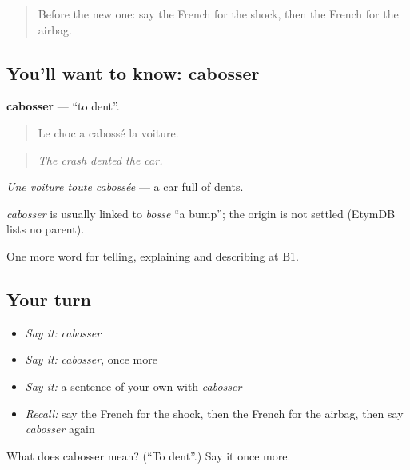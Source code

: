 \label{lesson:FR-C298-cabosser}



\begin{quote}
Before the new one: say the French for the shock, then the French for the airbag.
\end{quote}

\subsection*{You'll want to know: cabosser}
\textbf{cabosser} — \textquotedblleft{}to dent\textquotedblright{}.

\begin{quote}
Le choc a cabossé la voiture.
\end{quote}

\begin{quote}
\emph{The crash dented the car.}
\end{quote}

\emph{Une voiture toute cabossée} — a car full of dents.

\begin{cousinweb}
\emph{cabosser} is usually linked to \emph{bosse} \textquotedblleft{}a bump\textquotedblright{}; the origin is not settled (EtymDB lists no parent).
\end{cousinweb}

\begin{grammarlens}[title={What you've built}]
One more word for telling, explaining and describing at B1.
\end{grammarlens}

\subsection*{Your turn}
\begin{itemize}
\raggedright
  \item \emph{Say it:} \emph{cabosser}
  \item \emph{Say it:} \emph{cabosser}, once more
  \item \emph{Say it:} a sentence of your own with \emph{cabosser}
  \item \emph{Recall:} say the French for the shock, then the French for the airbag, then say \emph{cabosser} again
\end{itemize}

\begin{tcolorbox}[breakable,colback=teal!4,colframe=teal!35!black,title={Before you move on}]
What does cabosser mean? (\textquotedblleft{}To dent\textquotedblright{}.) Say it once more.
\end{tcolorbox}
